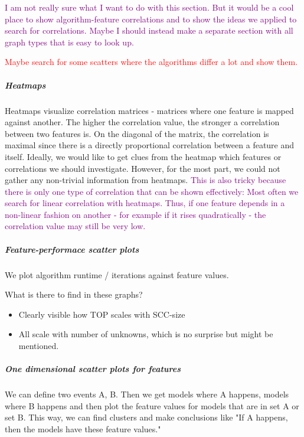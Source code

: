 \textcolor{purple}{I am not really sure what I want to do with this section. 
But it would be a cool place to show algorithm-feature correlations and to show the ideas we applied to search for correlations.
Maybe I should instead make a separate section with all graph types that is easy to look up.}

\textcolor{red}{Maybe search for some scatters where the algorithms differ a lot and show them.}

\subparagraph*{Heatmaps}
Heatmaps visualize correlation matrices - matrices where one feature is mapped against another. The higher the correlation value, the stronger
a correlation between two features is. On the diagonal of the matrix, the correlation is maximal since there is a directly proportional correlation between
a feature and itself. Ideally, we would like to get clues from the heatmap which features or correlations we should investigate.
However, for the most part, we could not gather any non-trivial information from heatmaps. \textcolor{purple}{This is also tricky because
there is only one type of correlation that can be shown effectively: Most often we search for linear correlation with heatmaps. Thus,
if one feature depends in a non-linear fashion on another - for example if it rises quadratically - the correlation value may still be very low.}

\subparagraph*{Feature-performace scatter plots}
We plot algorithm runtime / iterations against feature values.

What is there to find in these graphs?
\begin{itemize}
    \item Clearly visible how TOP scales with SCC-size
    \item All scale with number of unknowns, which is no surprise but might be mentioned.
\end{itemize}

\subparagraph*{One dimensional scatter plots for features}
We can define two events A, B. Then we get models where A happens, models where B happens and then plot the feature values for models that are in set A or set B.
This way, we can find clusters and make conclusions like "If A happens, then the models have these feature values."